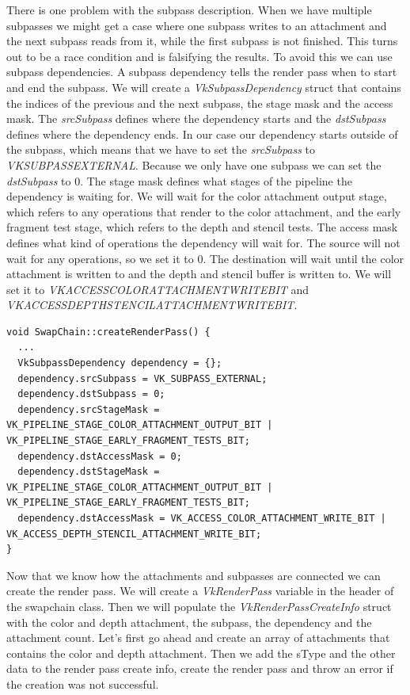\documentclass[12pt]{report} \usepackage{preamble}
\begin{document}
There is one problem with the subpass description. When we have multiple subpasses we might get a case where one subpass
writes to an attachment and the next subpass reads from it, while the first subpass is not finished. This turns out
to be a race condition and is falsifying the results. To avoid this we can use subpass dependencies. A subpass dependency
tells the render pass when to start and end the subpass. We will create a \textit{VkSubpassDependency} struct that contains
the indices of the previous and the next subpass, the stage mask and the access mask. The \textit{srcSubpass} defines
where the dependency starts and the \textit{dstSubpass} defines where the dependency ends. In our case our dependency
starts outside of the subpass, which means that we have to set the \textit{srcSubpass} to
\textit{VK\textunderscore SUBPASS\textunderscore EXTERNAL}. Because we only have one subpass we can set the
\textit{dstSubpass} to 0. The stage mask defines what stages of the pipeline the dependency is waiting for. We will
wait for the color attachment output stage, which refers to any operations that render to the color attachment, and
the early fragment test stage, which refers to the depth and stencil tests. The access mask defines what kind of
operations the dependency will wait for. The source will not wait for any operations, so we set it to 0. The destination
will wait until the color attachment is written to and the depth and stencil buffer is written to. We will set it to
\textit{VK\textunderscore ACCESS\textunderscore COLOR\textunderscore ATTACHMENT\textunderscore WRITE\textunderscore BIT}
and \textit{VK\textunderscore ACCESS\textunderscore DEPTH\textunderscore STENCIL\textunderscore ATTACHMENT\textunderscore WRITE\textunderscore BIT}.

\begin{lstlisting}[Language=C++]
void SwapChain::createRenderPass() {
  ...
  VkSubpassDependency dependency = {};
  dependency.srcSubpass = VK_SUBPASS_EXTERNAL;
  dependency.dstSubpass = 0;
  dependency.srcStageMask = VK_PIPELINE_STAGE_COLOR_ATTACHMENT_OUTPUT_BIT | VK_PIPELINE_STAGE_EARLY_FRAGMENT_TESTS_BIT;
  dependency.dstAccessMask = 0;
  dependency.dstStageMask = VK_PIPELINE_STAGE_COLOR_ATTACHMENT_OUTPUT_BIT | VK_PIPELINE_STAGE_EARLY_FRAGMENT_TESTS_BIT;
  dependency.dstAccessMask = VK_ACCESS_COLOR_ATTACHMENT_WRITE_BIT | VK_ACCESS_DEPTH_STENCIL_ATTACHMENT_WRITE_BIT;
}
\end{lstlisting}

Now that we know how the attachments and subpasses are connected we can create the render pass. We will create a
\textit{VkRenderPass} variable in the header of the swapchain class. Then we will
populate the \textit{VkRenderPassCreateInfo} struct with the color and depth attachment, the subpass, the dependency
and the attachment count. Let's first go ahead and create an array of attachments that contains the color and depth
attachment. Then we add the sType and the other data to the render pass create info, create the render pass and
throw an error if the creation was not successful.
\end{document}
